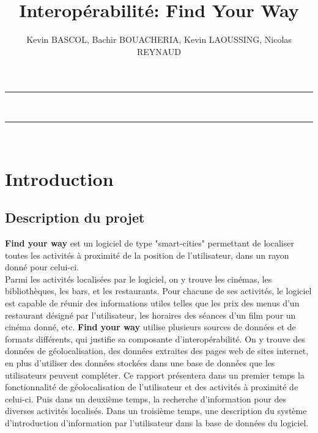 \documentclass[10pt,a4paper]{report}
\author{Kevin BASCOL, Bachir BOUACHERIA, Kevin LAOUSSING, Nicolas REYNAUD}
\title{ Interopérabilité: Find Your Way}
\begin{document}
\makeatletter
	\begin{titlepage}
	
	\centering
		{
		\vspace*{5cm}
		\hrule height 2pt
		\vspace{0.7cm}
		\Huge \textbf{\@title}}\\
		\vspace{0.7cm}
		\hrule height 2pt
		
		\vfill
		\vspace{1cm}
		\@author\\
		\end{titlepage}
\makeatother
\setcounter{secnumdepth}{4}
\setcounter{tocdepth}{3}
\renewcommand{\contentsname}{Sommaire}
\begingroup\makeatletter
\def\@makeschapterhead#1{%
  {\parindent \z@ \raggedright
    \normalfont
    \interlinepenalty\@M
    \Huge \bfseries  #1\par\nobreak
    \vskip 20pt%
  }}\makeatother
\tableofcontents
\endgroup
\thispagestyle{empty}
\setcounter{page}{0}
\newpage


\section{Introduction}

\subsection{Description du projet}
\begin{flushleft}
\textbf{Find your way} est un logiciel de type "smart-cities" permettant de localiser toutes les activités à proximité de la position de l'utilisateur, dans un rayon donné pour celui-ci.\\
Parmi les activités localisées par le logiciel, on y trouve les cinémas, les bibliothèques, les bars, et les restaurants. Pour chacune de ses activités, le logiciel est capable de réunir des informations utiles telles que les prix des menus d'un restaurant désigné par l'utilisateur, les horaires des séances d'un film pour un cinéma donné, etc.
\textbf{Find your way} utilise plusieurs sources de données et de formats différents, qui justifie sa composante d'interopérabilité. On y trouve des données de géolocalisation, des données extraites des pages web de sites internet, en plus d'utiliser des données stockées dans une base de données que les utilisateurs peuvent compléter.
Ce rapport présentera dans un premier temps la fonctionnalité de géolocalisation de l'utilisateur et des activités à proximité de celui-ci. Puis dans un deuxième temps, la recherche d'information pour des diverses activités localisés. Dans un troisième temps, une description du système d'introduction d'information par l'utilisateur dans la base de données du logiciel.

\end{flushleft}
\end{document}

